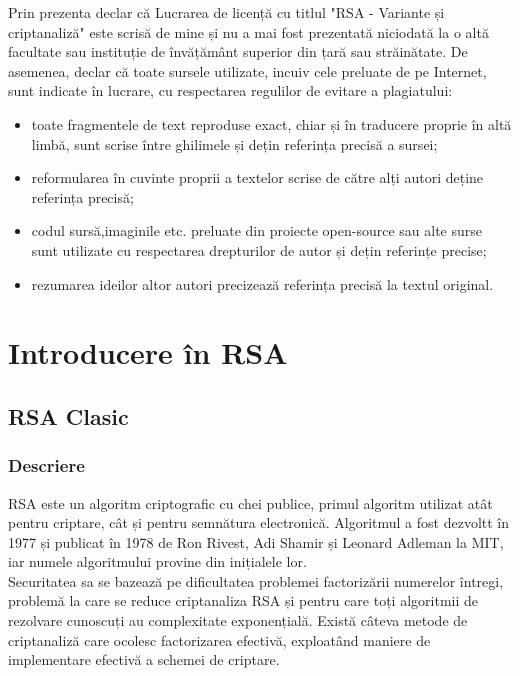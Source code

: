 \documentclass[12pt, oneside]{book}
\begin{document}
Prin prezenta declar că Lucrarea de licență cu titlul "RSA - Variante și criptanaliză" este scrisă de mine și nu a mai fost prezentată niciodată la o altă facultate sau instituție de învățământ superior din țară sau străinătate. De asemenea, declar că toate sursele utilizate, incuiv cele preluate de pe Internet, sunt indicate în lucrare, cu respectarea regulilor de evitare a plagiatului:
\begin{itemize}
\item toate fragmentele de text reproduse exact, chiar și în traducere proprie în altă limbă, sunt scrise între ghilimele și dețin referința precisă a sursei;
\item reformularea în cuvinte proprii a textelor scrise de către alți autori deține referința precisă;
\item codul sursă,imaginile etc. preluate din proiecte open-source sau alte surse sunt utilizate cu respectarea drepturilor de autor și dețin referințe precise;
\item rezumarea ideilor altor autori precizează referința precisă la textul original.
\end{itemize}
\newcommand{\doubleSignature}[3]{
\begin{minipage}[c]{\textwidth}
\vspace{2cm}

\makebox[12cm][c]{
 #1, \today 
}
\vspace{3cm}

\makebox[12cm][c]{
\hfill \makebox[5cm][c] {\hrulefill} \hfill \makebox[5cm][c] {\hrulefill} \hfill
}
\makebox[12cm][c]{
\hfill #2 \hfill #3 \hfill
}
\vspace{1cm}
\end{minipage}
}
\doubleSignature{Trondheim}{Ivar Nesje}{Team mate's name}
\tableofcontents
\clearpage
\chapter{Introducere în RSA}

\section{RSA Clasic}
\subsection{Descriere}
RSA este un algoritm criptografic cu chei publice, primul algoritm utilizat atât pentru criptare, cât și pentru semnătura electronică. Algoritmul a fost dezvoltt în 1977 și publicat în 1978 de Ron Rivest, Adi Shamir și Leonard Adleman la MIT, iar numele algoritmului provine din inițialele lor. \\
Securitatea sa se bazează pe dificultatea problemei factorizării numerelor întregi, problemă la care se reduce criptanaliza RSA și pentru care toți algoritmii de rezolvare cunoscuți au complexitate exponențială. Există câteva metode de criptanaliză care ocolesc factorizarea efectivă, exploatând maniere de implementare efectivă a schemei de criptare.
\end{document}
